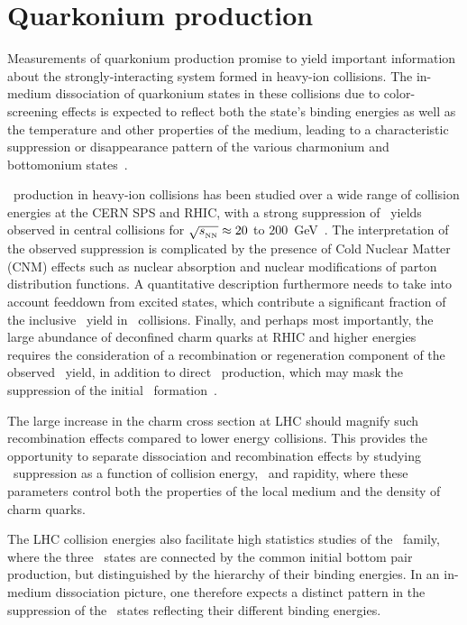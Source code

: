 \section{Quarkonium production}
\label{sec:qurkonia}
Measurements of quarkonium production promise to yield important information about the
strongly-interacting system formed in heavy-ion collisions.
The in-medium dissociation of quarkonium states in these collisions due to color-screening effects
is expected to reflect both the state's binding energies as
well as the temperature and other properties of the medium, leading to a characteristic
suppression or disappearance pattern of the various charmonium and
bottomonium states~\cite{Matsui:1986dk,Digal:2001ue,Mocsy:2007jz}.

\jpsi\ production in heavy-ion collisions has been studied over a wide range of
collision energies at the CERN SPS and RHIC, with a strong suppression of \jpsi\
yields observed in central collisions for $\sqrt{s_{_{\rm NN}}} \approx 20$ to
$200$~GeV~\cite{Baglin:1994ui,Alessandro:2004ap,Alessandro:2006ju,Adare:2006ns,
Arnaldi:2007zz,Adare:2011yf}.
The interpretation of the observed suppression is complicated by the presence
of Cold Nuclear Matter (CNM) effects such as nuclear absorption and nuclear
modifications of parton distribution functions. A quantitative
description furthermore needs to take into account feeddown from excited states,
which contribute a significant fraction of the inclusive \jpsi\ yield in \pp\ collisions.
Finally, and perhaps most importantly, the large abundance of deconfined charm quarks
at RHIC and higher energies requires the consideration of a recombination or regeneration
component of the observed \jpsi\ yield, in addition to direct \jpsi\ production, which
may mask the suppression of the initial
\jpsi\ formation~\cite{BraunMunzinger:2000px,Thews:2000rj,Zhao:2007hh,Capella:2007jv}.

The large increase in the charm cross section at LHC should magnify such recombination
effects compared to lower energy collisions. This provides the opportunity to separate
dissociation and recombination effects by studying \jpsi\ suppression
as a function of collision energy, \pT\ and rapidity, where these parameters
control both the properties of the local medium and the density of charm quarks.

The LHC collision energies also facilitate high statistics studies of the \PgU\ family, where
the three \PgUn\ states are connected by the common initial bottom pair production,
but distinguished by the hierarchy of their binding energies. In an
in-medium dissociation picture, one therefore expects a distinct pattern in the suppression
of the \PgUn\ states reflecting their different binding energies.

